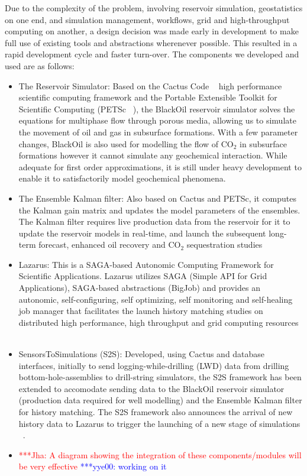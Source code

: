 \documentclass[conference,final]{IEEEtran}
\newcommand{\jhanote}[1]{ {\textcolor{red} { ***Jha: #1 }}}
\newcommand{\yyenote}[1]{ {\textcolor{blue} { ***yye00: #1 }}}
\newcommand{\jhanote}[1]{}
\newcommand{\yyenote}[1]{}
\begin{document}
Due to the complexity of the problem, involving reservoir simulation, geostatistics on one end, and simulation management, 
workflows, grid and high-throughput computing on another, a design decision was made early in development to make full use of 
existing tools and abstractions wherenever possible. This resulted in a rapid development cycle and faster turn-over. The 
components we developed and used are as follows:

\begin{itemize}
\item The Reservoir Simulator: Based on the Cactus Code ~\cite{cactus_web} high performance scientific computing framework and the 
Portable Extensible Toolkit for Scientific Computing (PETSc ~\cite{PETSc}), the BlackOil reservoir simulator solves the equations 
for multiphase flow through porous media, allowing us to simulate the movement of oil and gas in subsurface formations. With a few 
parameter changes, BlackOil is also used for modelling the flow of CO$_2$ in subsurface formations however it cannot simulate any 
geochemical interaction. While adequate for first order approximations, it is still under heavy development to enable it to 
satisfactorily model geochemical phenomena.

\item The Ensemble Kalman filter: Also based on Cactus and PETSc, it computes the Kalman gain matrix and updates the model 
parameters of the ensembles. The Kalman filter requires live production data from the reservoir for it to update the reservoir 
models in real-time, and launch the subsequent long-term forecast, enhanced oil recovery and CO$_2$ sequestration studies

\item Lazarus: This is a SAGA-based Autonomic Computing Framework for Scientific Applications. Lazarus utilizes SAGA (Simple API 
for Grid Applications), SAGA-based abstractions (BigJob) and provides an autonomic, self-configuring, self optimizing, self 
monitoring and self-healing job manager that facilitates the launch history matching studies on distributed high performance, high 
throughput and grid computing resources ~\cite{gmac}

\item SensorsToSimulations (S2S): Developed, using Cactus and database interfaces, initially to send logging-while-drilling (LWD) 
data from drilling bottom-hole-assemblies to drill-string simulators, the S2S framework has been extended to accomodate sending 
data to the BlackOil reservoir simulator (production data required for well modelling) and the Ensemble Kalman filter for history 
matching. The S2S framework also announces the arrival of new history data to Lazarus to trigger the launching of a new stage of 
simulations ~\cite{Duff1,Duff2}.

\item \jhanote{A diagram showing the integration of these components/modules will be very effective}\yyenote{working on it}


\end{itemize}
\end{document}
